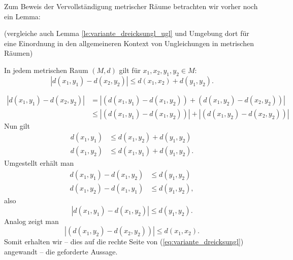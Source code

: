\documentclass[10pt]{scrbook}
\begin{document}
Zum Beweis der Vervollständigung metrischer Räume betrachten wir vorher noch ein Lemma:
\begin{Le}
\label{le:variante_dreicksungl} (vergleiche auch Lemma \ref{le:variante_dreicksungl_ugl} und Umgebung dort für eine Einordnung in den allgemeineren Kontext von Ungleichungen in metrischen Räumen)

In jedem metrischen Raum $(M, d)$ gilt für $x_1, x_2, y_1, y_2\in M$:
\begin{equation}
	\left|d(x_1, y_1)-d(x_2, y_2)\right|\leq d(x_1, x_2)+d(y_1, y_2).
\end{equation}
\end{Le}
\begin{bew}
\begin{align}
|d(x_1, y_1)-d(x_2, y_2)| & = \left|(d(x_1, y_1)-d(x_1, y_2))+(d(x_1, y_2)-d(x_2, y_2))\right| \nonumber \\
& \leq \left|(d(x_1, y_1)-d(x_1, y_2))\right|+\left|(d(x_1, y_2)-d(x_2, y_2))\right| \label{eq:variante_dreicksungl}
\end{align}
Nun gilt
\begin{align*}
d(x_1, y_1) & \leq d(x_1, y_2)+d(y_1, y_2) \\
d(x_1, y_2) & \leq d(x_1, y_1)+d(y_1, y_2).
\end{align*}
Umgestellt erhält man
\begin{align*}
d(x_1, y_1)-d(x_1, y_2) & \leq d(y_1, y_2) \\
d(x_1, y_2)-d(x_1, y_1) & \leq d(y_1, y_2),
\end{align*}
also
\begin{displaymath}
\left|d(x_1, y_1)-d(x_1, y_2)\right| \leq d(y_1, y_2).
\end{displaymath}
Analog zeigt man
\begin{displaymath}
\left|(d(x_1, y_2)-d(x_2, y_2))\right| \leq d(x_1, x_2).
\end{displaymath}
Somit erhalten wir -- dies auf die rechte Seite von (\ref{eq:variante_dreicksungl}) angewandt -- die geforderte Aussage.
\end{bew}
\end{document}
